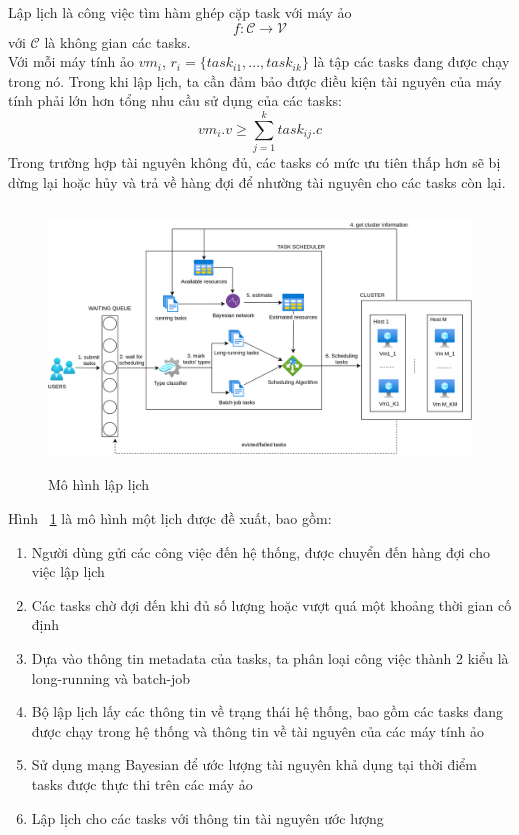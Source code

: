 \documentclass{my_style}
\begin{document}
Lập lịch là công việc tìm hàm ghép cặp task với máy ảo 
\[
f: \mathcal{C} \rightarrow \mathcal{V}
\]
với $\mathcal{C}$ là không gian các tasks.\\
Với mỗi máy tính ảo $vm_{i}$, $r_{i} = \{task_{i1}, ..., task_{ik}\}$ là tập các tasks đang được chạy trong nó. Trong khi lập lịch, ta cần đảm bảo được điều kiện tài nguyên của máy tính phải lớn hơn tổng nhu cầu sử dụng của các tasks: 
\[
	vm_{i}.v \geq \sum_{j = 1}^{k}task_{ij}.c
\]
Trong trường hợp tài nguyên không đủ, các tasks có mức ưu tiên thấp hơn sẽ bị dừng lại hoặc hủy và trả về hàng đợi để nhường tài nguyên cho các tasks còn lại. 
\begin{figure}
	\centering
	\includegraphics[scale=0.5, height=7cm]{images/system_flows.png}
	\caption{Mô hình lập lịch}
	\label{fig:systemflow}
\end{figure}
Hình ~\ref{fig:systemflow} là mô hình một lịch được đề xuất, bao gồm: 
\begin{enumerate}
	\item Người dùng gửi các công việc đến hệ thống, được chuyển đến hàng đợi cho việc lập lịch
	\item Các tasks chờ đợi đến khi đủ số lượng hoặc vượt quá một khoảng thời gian cố định 
	\item Dựa vào thông tin metadata của tasks, ta phân loại công việc thành 2 kiểu là long-running và batch-job
	\item Bộ lập lịch lấy các thông tin về trạng thái hệ thống, bao gồm các tasks đang được chạy trong hệ thống và thông tin về tài nguyên của các máy tính ảo 
	\item Sử dụng mạng Bayesian để ước lượng tài nguyên khả dụng tại thời điểm tasks được thực thi trên các máy ảo 
	\item Lập lịch cho các tasks với thông tin tài nguyên ước lượng
\end{enumerate}
\end{document}
